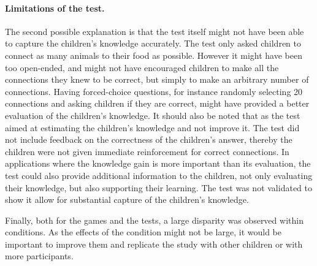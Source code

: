 \paragraph{Limitations of the test.} 
The second possible explanation is that the test itself might not have been able to capture the children's knowledge accurately. The test only asked children to connect as many animals to their food as possible. However it might have been too open-ended, and might not have encouraged children to make all the connections they knew to be correct, but simply to make an arbitrary number of connections. %
Having forced-choice questions, for instance randomly selecting 20 connections and asking children if they are correct, might have provided a better evaluation of the children's knowledge. It should also be noted that as the test aimed at estimating the children's knowledge and not improve it. The test did not include feedback on the correctness of the children's answer, thereby the children were not given immediate reinforcement for correct connections. In applications where the knowledge gain is more important than its evaluation, the test could also provide additional information to the children, not only evaluating their knowledge, but also supporting their learning. The test was not validated to show it allow for substantial capture of the children's knowledge.

Finally, both for the games and the tests, a large disparity was observed within conditions. As the effects of the condition might not be large, it would be important to improve them and replicate the study with other children or with more participants.



